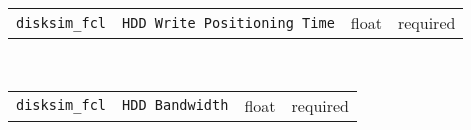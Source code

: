 \noindent 
\begin{tabular}{|p{\lpmodwidth}|p{\lpnamewidth}|p{0.5in}|p{0.5in}|}
\cline{1-4}
\texttt{disksim\_fcl} & \texttt{HDD Write Positioning Time} & float & required \\ 
\cline{1-4}
\end{tabular}\\ 
\noindent 
\begin{tabular}{|p{\lpmodwidth}|p{\lpnamewidth}|p{0.5in}|p{0.5in}|}
\cline{1-4}
\texttt{disksim\_fcl} & \texttt{HDD Bandwidth} & float & required \\ 
\cline{1-4}
\end{tabular}\\ 
